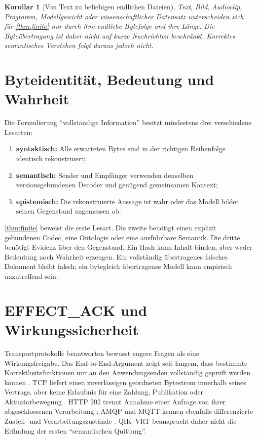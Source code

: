 \documentclass[11pt,a4paper]{article}
\newtheorem{korollar}{Korollar}[section]
\theoremstyle{remark}
\newcommand{\qikvrt}{QIK--VRT}
\begin{document}
\begin{korollar}[Von Text zu beliebigen endlichen Dateien]
Text, Bild, Audioclip, Programm, Modellgewicht oder wissenschaftlicher
Datensatz unterscheiden sich für \cref{thm:finite} nur durch ihre endliche
Bytefolge und ihre Länge. Die Byteübertragung ist daher nicht auf kurze
Nachrichten beschränkt. Korrektes semantisches Verstehen folgt daraus jedoch
nicht.
\end{korollar}

\section{Byteidentität, Bedeutung und Wahrheit}

Die Formulierung ``vollständige Information'' besitzt mindestens drei
verschiedene Lesarten:

\begin{enumerate}
  \item \textbf{syntaktisch:} Alle erwarteten Bytes sind in der richtigen
        Reihenfolge identisch rekonstruiert;
  \item \textbf{semantisch:} Sender und Empfänger verwenden denselben
        versionsgebundenen Decoder und genügend gemeinsamen Kontext;
  \item \textbf{epistemisch:} Die rekonstruierte Aussage ist wahr oder das
        Modell bildet seinen Gegenstand angemessen ab.
\end{enumerate}

\cref{thm:finite} beweist die erste Lesart. Die zweite benötigt einen
explizit gebundenen Codec, eine Ontologie oder eine ausführbare Semantik. Die
dritte benötigt Evidenz über den Gegenstand. Ein Hash kann Inhalt binden,
aber weder Bedeutung noch Wahrheit erzeugen. Ein vollständig übertragenes
falsches Dokument bleibt falsch; ein bytegleich übertragenes Modell kann
empirisch unzutreffend sein.

\section{EFFECT\_ACK und Wirkungssicherheit}

Transportprotokolle beantworten bewusst engere Fragen als eine
Wirkungsfreigabe. Das End-to-End-Argument zeigt seit langem, dass bestimmte
Korrektheitsfunktionen nur an den Anwendungsenden vollständig geprüft werden
können \cite{saltzer}. TCP liefert einen zuverlässigen geordneten Bytestrom
innerhalb seines Vertrags, aber keine Erlaubnis für eine Zahlung, Publikation
oder Aktuatorbewegung \cite{rfc9293}. HTTP 202 trennt Annahme einer Anfrage
von ihrer abgeschlossenen Verarbeitung \cite{rfc9110}; AMQP und MQTT kennen
ebenfalls differenzierte Zustell- und Verarbeitungszustände
\cite{amqp,mqtt}. \qikvrt{} beansprucht daher nicht die Erfindung der ersten
``semantischen Quittung''.
\end{document}
